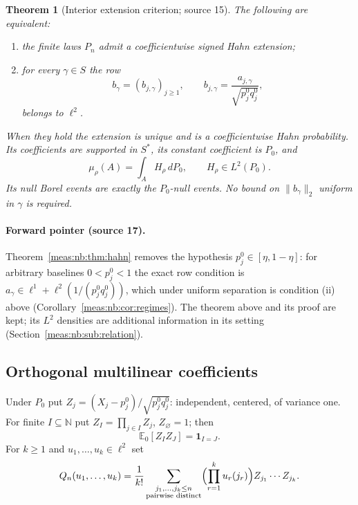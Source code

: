 \documentclass[11pt]{article}
\numberwithin{equation}{section}
\newtheorem{theorem}{Theorem}[section]
\theoremstyle{definition}
\theoremstyle{remark}
\newcommand{\N}{\mathbb N}
\newcommand{\E}{\mathbb E}
\newcommand{\ind}{\mathbf 1}
\newcommand{\norm}[1]{\lVert#1\rVert}
\begin{document}
\begin{theorem}[Interior extension criterion; source 15]
\label{meas:thm:interior}
The following are equivalent:
\begin{enumerate}[label=(\roman*)]
\item the finite laws $P_n$ admit a coefficientwise signed Hahn extension;
\item for every $\gamma\in S$ the row
\begin{equation}\label{meas:eq:b-row}
 b_\gamma=(b_{j,\gamma})_{j\ge1},\qquad b_{j,\gamma}=\frac{a_{j,\gamma}}{\sqrt{p_j^0q_j^0}},
\end{equation}
belongs to $\ell^2$.
\end{enumerate}
When they hold the extension is unique and is a coefficientwise Hahn
probability. Its coefficients are supported in $S^*$, its constant coefficient
is $P_0$, and
\begin{equation}\label{meas:eq:density-measure}
 \mu_\rho(A)=\int_AH_\rho\,dP_0,\qquad H_\rho\in L^2(P_0).
\end{equation}
Its null Borel events are exactly the $P_0$-null events. No bound on
$\norm{b_\gamma}_2$ uniform in $\gamma$ is required.
\end{theorem}

\paragraph{Forward pointer (source 17).} Theorem~\ref{meas:nb:thm:hahn} removes the
hypothesis $p_j^0\in[\eta,1-\eta]$: for arbitrary baselines $0<p_j^0<1$ the exact row
condition is $a_\gamma\in\ell^1+\ell^2(1/(p_j^0q_j^0))$, which under uniform separation is
condition (ii) above (Corollary~\ref{meas:nb:cor:regimes}). The theorem above and its
proof are kept; its $L^2$ densities are additional information in its setting
(Section~\ref{meas:nb:sub:relation}).

\subsection{Orthogonal multilinear coefficients}

Under $P_0$ put $Z_j=(X_j-p_j^0)/\sqrt{p_j^0q_j^0}$: independent, centered, of
variance one. For finite $I\subseteq\N$ put $Z_I=\prod_{j\in I}Z_j$, $Z_\varnothing=1$;
then
\begin{equation}\label{meas:eq:orthogonality}
 \E_0[Z_IZ_J]=\ind_{I=J}.
\end{equation}
For $k\ge1$ and $u_1,\ldots,u_k\in\ell^2$ set
\begin{equation}\label{meas:eq:Q}
 Q_n(u_1,\ldots,u_k)=\frac1{k!}
 \sum_{\substack{j_1,\ldots,j_k\le n\\\text{pairwise distinct}}}
 \Bigl(\prod_{r=1}^ku_r(j_r)\Bigr)Z_{j_1}\cdots Z_{j_k}.
\end{equation}
\end{document}
